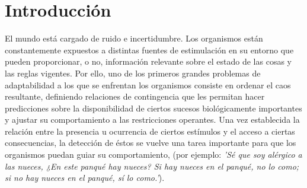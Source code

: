 
\chapter{Introducción} %

\label{Chapter1} %


\newcommand{\keyword}[1]{\textbf{#1}}
\newcommand{\tabhead}[1]{\textbf{#1}}
\newcommand{\code}[1]{\texttt{#1}}
\newcommand{\file}[1]{\texttt{\bfseries#1}}
\newcommand{\option}[1]{\texttt{\itshape#1}}


El mundo está cargado de ruido e incertidumbre. Los organismos están constantemente expuestos a distintas fuentes de estimulación en su entorno que pueden proporcionar, o no, información relevante sobre el estado de las cosas y las reglas vigentes. Por ello, uno de los primeros grandes problemas de adaptabilidad a los que se enfrentan los organismos consiste en ordenar el caos resultante, definiendo relaciones de contingencia que les permitan hacer predicciones sobre la disponibilidad de ciertos sucesos biológicamente importantes y ajustar su comportamiento a las restricciones operantes. Una vez establecida la relación entre la presencia u ocurrencia de ciertos estímulos y el acceso a ciertas consecuencias, la detección de éstos se vuelve una tarea importante para que los organismos puedan guiar su comportamiento, (por ejemplo: \textit{'Sé que soy alérgico a las nueces, ¿En este panqué hay nueces? Si hay nueces en el panqué, no lo como; si no hay nueces en el panqué, sí lo como.'}).\\


